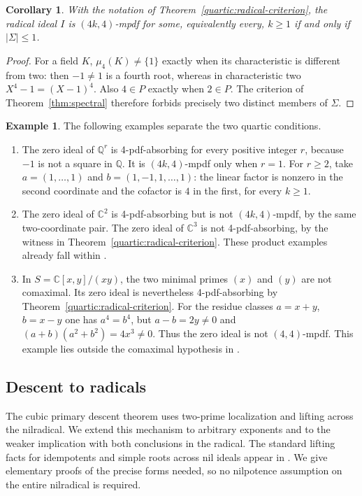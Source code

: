 \documentclass[11pt,a4paper]{amsart}
\newtheorem{corollary}[theorem]{Corollary}
\theoremstyle{definition}
\newtheorem{example}[theorem]{Example}
\theoremstyle{remark}
\newcommand{\Q}{\mathbb Q}
\newcommand{\C}{\mathbb C}
\numberwithin{equation}{section}
\begin{document}
\begin{corollary}\label{quartic:strict-radical-comparison}
With the notation of Theorem~\ref{quartic:radical-criterion}, the
radical ideal $I$ is $(4k,4)$-mpdf for some, equivalently every,
$k\ge1$ if and only if $|\Sigma|\le1$.
\end{corollary}
\begin{proof}
For a field $K$, $\mu_4(K)\ne\{1\}$ exactly when its
characteristic is different from two: then $-1\ne1$ is a fourth
root, whereas in characteristic two $X^4-1=(X-1)^4$.
Also $4\in P$ exactly when $2\in P$. The criterion of
Theorem~\ref{thm:spectral} therefore forbids precisely two
distinct members of $\Sigma$.
\end{proof}

\begin{example}\label{quartic:radical-examples}
The following examples separate the two quartic conditions.
\begin{enumerate}
\item The zero ideal of $\Q^r$ is 4-pdf-absorbing for every
positive integer $r$, because $-1$ is not a square in $\Q$.
It is $(4k,4)$-mpdf only when $r=1$. For $r\ge2$, take
$a=(1,\ldots,1)$ and $b=(1,-1,1,\ldots,1)$: the linear
factor is nonzero in the second coordinate and the cofactor
is $4$ in the first, for every $k\ge1$.
\item The zero ideal of $\C^2$ is 4-pdf-absorbing but is not
$(4k,4)$-mpdf, by the same two-coordinate pair.
The zero ideal of $\C^3$ is not 4-pdf-absorbing, by the witness
in Theorem~\ref{quartic:radical-criterion}. These product examples
already fall within \cite[Theorem~2.8]{TAHA}.
\item In $S=\C[x,y]/(xy)$, the two minimal primes $(x)$ and
$(y)$ are not comaximal. Its zero ideal is nevertheless
4-pdf-absorbing by Theorem~\ref{quartic:radical-criterion}.
For the residue classes $a=x+y$, $b=x-y$ one has $a^4=b^4$,
but $a-b=2y\ne0$ and $(a+b)(a^2+b^2)=4x^3\ne0$.
Thus the zero ideal is not $(4,4)$-mpdf. This example lies
outside the comaximal hypothesis in \cite[Theorem~2.8]{TAHA}.
\end{enumerate}
\end{example}

\subsection{Descent to radicals}

The cubic primary descent theorem \cite[Theorem~2]{YSO} uses
two-prime localization and lifting across the nilradical. We extend
this mechanism to arbitrary exponents and to the weaker implication
with both conclusions in the radical. The standard lifting facts
for idempotents and simple roots across nil ideals appear in
\cite[Tags 00J9 and 0ALI]{Stacks}. We give elementary
proofs of the precise forms needed, so no nilpotence assumption on the
entire nilradical is required.
\end{document}
